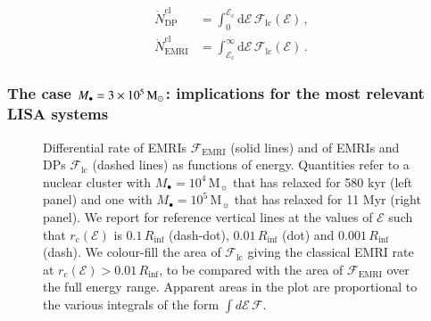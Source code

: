 \documentclass[desactivate]{aa}
\begin{document}
    \begin{align}\label{eq:oldLCrates}
        \dot{N}_\mathrm{DP}^\mathrm{cl} &= \int_0^{\mathcal{E}_\mathrm{c}} \mathrm{d}\mathcal{E} \,\mathcal{F}_\mathrm{lc}(\mathcal{E})\, ,\\
        \dot{N}_\mathrm{EMRI}^\mathrm{cl} &= \int_{\mathcal{E}_\mathrm{c}}^{\infty} \mathrm{d}\mathcal{E} \,\mathcal{F}_\mathrm{lc}(\mathcal{E}) \, .
    \end{align}

    
\subsubsection{The case $M_\bullet=3\times10^5\, {\rm M}_\odot$: implications for the most relevant LISA systems}

    \begin{figure}
            \centering
        \caption{Differential rate of EMRIs $\mathcal{F}_\mathrm{EMRI}$ (solid lines) and of EMRIs and DPs $\mathcal{F}_\mathrm{lc}$ (dashed lines) as functions of energy. Quantities refer to a nuclear cluster with $M_\bullet = 10^4\, \mathrm{M_\sun}$ that has relaxed for 580 kyr (left panel) and one with $M_\bullet = 10^5\, \mathrm{M_\sun}$ that has relaxed for 11 Myr (right panel). We report for reference vertical lines at the values of $\mathcal{E}$ such that $r_\mathrm{c}(\mathcal{E})$ is $0.1\,R_\mathrm{inf}$ (dash-dot), $0.01\, R_\mathrm{inf}$ (dot) and $0.001\,R_\mathrm{inf}$ (dash). We colour-fill the area of $\mathcal{F}_\mathrm{lc}$ giving the classical EMRI rate at $r_\mathrm{c}(\mathcal{E}) > 0.01\,R_\mathrm{inf}$, to be compared with the area of $\mathcal{F}_\mathrm{EMRI}$ over the full energy range. Apparent areas in the plot are proportional to the various integrals of the form $\int d\mathcal{E} \,\mathcal{F}$.}
        \label{fig:rates2}
    \end{figure}
    
\end{document}
